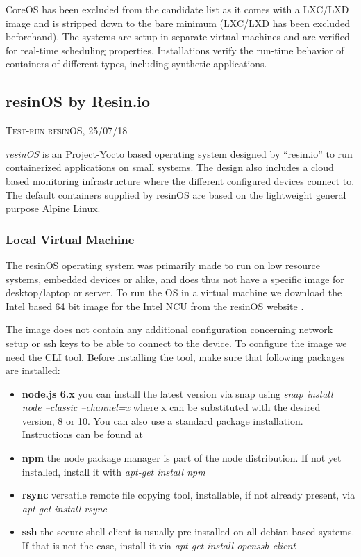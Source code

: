 \documentclass[]{scrartcl}
\begin{document}
CoreOS has been excluded from the candidate list as it comes with a LXC/LXD image and is stripped down to the bare minimum (LXC/LXD has been excluded beforehand). The systems are setup in separate virtual machines and are verified for real-time scheduling properties. Installations verify the run-time behavior of containers of different types, including synthetic applications.

\subsection{resinOS by Resin.io}

{\small\textsc{Test-run resinOS, 25/07/18} \bigskip}

\textit{resinOS} is an Project-Yocto based operating system designed by ``resin.io'' to run containerized applications on small systems. The design also includes a cloud based monitoring infrastructure where the different configured devices connect to. The default containers supplied by resinOS are based on the lightweight general purpose Alpine Linux.

\subsubsection{Local Virtual Machine}

The resinOS operating system was primarily made to run on low resource systems, embedded devices or alike, and does thus not have a specific image for desktop/laptop or server. To run the OS in a virtual machine we download the Intel based 64 bit image for the Intel NCU from the resinOS website \cite{resin01}.

The image does not contain any additional configuration concerning network setup or ssh keys to be able to connect to the device. To configure the image we need the CLI tool. Before installing the tool, make sure that following packages are installed:

\begin{itemize}
	
	\item \textbf{node.js 6.x} you can install the latest version via snap using \textit{snap install node --classic --channel=x} where x can be substituted with the desired version, 8 or 10. You can also use a standard package installation. Instructions can be found at \cite{node01}
	\item \textbf{npm} the node package manager is part of the node distribution. If not yet installed, install it with \textit{apt-get install npm}
	\item \textbf{rsync} versatile remote file copying tool, installable, if not already present, via \textit{apt-get install rsync}
	\item \textbf{ssh} the secure shell client is usually pre-installed on all debian based systems. If that is not the case, install it via \textit{apt-get install openssh-client}
	
\end{itemize}
\end{document}
